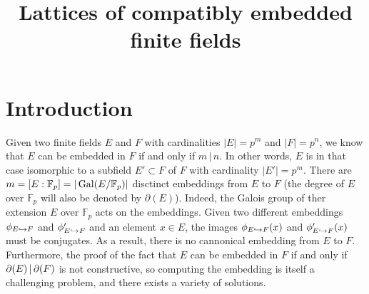 \documentclass[11pt]{article}
\title{Lattices of compatibly embedded finite fields}
\author{}
\begin{document}
\maketitle
\begin{center}
  

\end{center}

\section{Introduction}

Given two finite fields $E$ and $F$ with cardinalities $|E|=p^{m}$ and
$|F|=p^{n}$, we know that $E$ can be embedded in $F$ if and only if $m\,|\,n$.
In other words, $E$ is in that case isomorphic to a subfield $E'\subset F$ of $F$ with
cardinality $|E'|=p^{m}$. There are
$m=[E:\mathbb{F}_p]=|\operatorname{Gal}(E/\mathbb{F}_p)|$ disctinct embeddings from $E$ to
$F$ (the degree of $E$ over $\mathbb{F}_p$ will also be denoted by
$\partial(E)$). Indeed, the Galois group of ther extension $E$ over $\mathbb{F}_p$ acts
on the embeddings. Given two different embeddings $\phi_{E\hookrightarrow F}$ and
$\phi_{E\hookrightarrow F}'$ and an element $x\in E$, the images $\phi_{E\hookrightarrow F}(x)$ and
$\phi_{E\hookrightarrow F}'(x)$ must be conjugates. As a result, there is no cannonical
embedding from $E$ to $F$. Furthermore, the proof of the fact that $E$ can be
embedded in $F$ if and only if $\partial(E)\,|\,\partial(F)$ is not constructive, so computing the
embedding is itself a challenging problem, and there exists a variety of
solutions.
\end{document}

